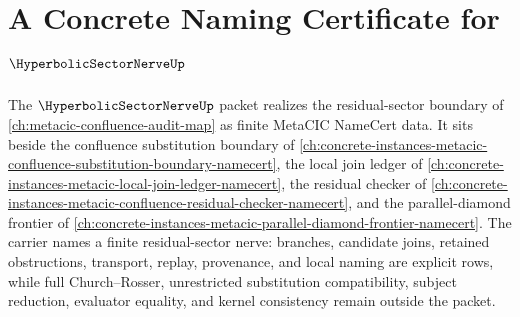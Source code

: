 \chapter{A Concrete Naming Certificate for $\HyperbolicSectorNerveUp$}
\label{ch:concrete-instances-hyperbolic-sector-nerve-namecert}

The $\HyperbolicSectorNerveUp$ packet realizes the residual-sector boundary of \autoref{ch:metacic-confluence-audit-map} as finite MetaCIC NameCert data. It sits beside the confluence substitution boundary of \autoref{ch:concrete-instances-metacic-confluence-substitution-boundary-namecert}, the local join ledger of \autoref{ch:concrete-instances-metacic-local-join-ledger-namecert}, the residual checker of \autoref{ch:concrete-instances-metacic-confluence-residual-checker-namecert}, and the parallel-diamond frontier of \autoref{ch:concrete-instances-metacic-parallel-diamond-frontier-namecert}. The carrier names a finite residual-sector nerve: branches, candidate joins, retained obstructions, transport, replay, provenance, and local naming are explicit rows, while full Church--Rosser, unrestricted substitution compatibility, subject reduction, evaluator equality, and kernel consistency remain outside the packet.

